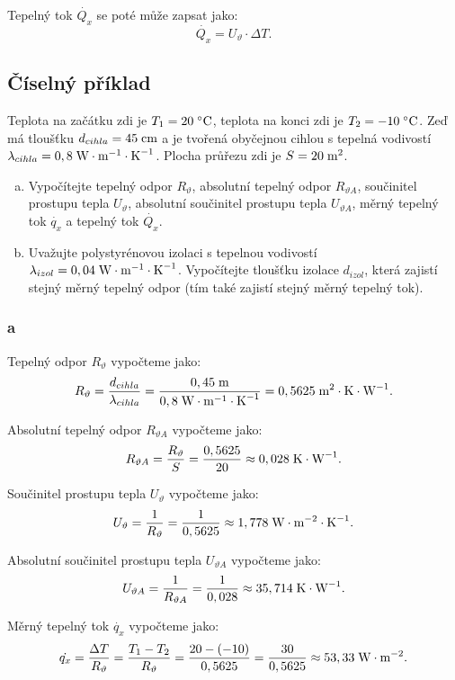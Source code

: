 \documentclass{article}
\begin{document}
Tepelný tok $\dot{Q_x}$ se poté může zapsat jako:
$$
    \dot{Q_x} = U_\vartheta \cdot \Delta T.
$$


\subsection{Číselný příklad}
Teplota na začátku zdi je $T_1 = 20 \; ^\circ \textrm{C}$, teplota na konci zdi je $T_2 = -10 \; ^\circ \textrm{C}$. Zeď má tloušťku $d_{cihla} = 45 \; \textrm{cm}$ a je tvořená obyčejnou cihlou s tepelná vodivostí $\lambda_{cihla} = 0,8 \; \textrm{W} \cdot \textrm{m}^{-1} \cdot \textrm{K}^{-1}$. Plocha průřezu zdi je $S = 20 \; \textrm{m}^{\textrm{2}}$.

\begin{enumerate}[a)]
    \item Vypočítejte tepelný odpor $R_{\vartheta}$,
          absolutní tepelný odpor $R_{\vartheta A}$, součinitel prostupu tepla $U_\vartheta$, absolutní součinitel prostupu tepla $U_{\vartheta A}$, měrný tepelný tok $\dot{q_x}$ a tepelný tok $\dot{Q_x}$.
    \item Uvažujte polystyrénovou izolaci s tepelnou vodivostí $\lambda_{izol} = 0,04 \; \textrm{W} \cdot \textrm{m}^{-1} \cdot \textrm{K}^{-1}$. Vypočítejte tloušťku izolace $d_{izol}$, která zajistí stejný měrný tepelný odpor (tím také zajistí stejný měrný tepelný tok).
\end{enumerate}

\subsubsection{a}
Tepelný odpor $R_{\vartheta}$ vypočteme jako:
$$
    R_{\vartheta} = \frac{d_{cihla}}{\lambda_{cihla}} = \frac{0,45 \; \textrm{m}}{0,8 \; \textrm{W} \cdot \textrm{m}^{-1} \cdot \textrm{K}^{-1}} = 0,5625 \; \textrm{m}^{\textrm{2}} \cdot \textrm{K} \cdot \textrm{W}^{-1}.
$$

Absolutní tepelný odpor $R_{\vartheta A}$ vypočteme jako:
$$
    R_{\vartheta A} = \frac{R_{\vartheta}}{S} = \frac{0,5625}{20} \approx 0,028 \; \textrm{K} \cdot \textrm{W}^{-1}.
$$

Součinitel prostupu tepla $U_\vartheta$ vypočteme jako:
$$
    U_\vartheta = \frac{1}{R_{\vartheta}} = \frac{1}{0,5625} \approx 1,778 \; \textrm{W} \cdot \textrm{m}^{-2} \cdot \textrm{K}^{-1}.
$$

Absolutní součinitel prostupu tepla $U_{\vartheta A}$ vypočteme jako:
$$
    U_{\vartheta A} = \frac{1}{R_{\vartheta A}} = \frac{1}{0,028} \approx 35,714 \; \textrm{K} \cdot \textrm{W}^{-1}.
$$

Měrný tepelný tok $\dot{q_x}$ vypočteme jako:
$$
    \dot{q_x} = \frac{\Delta T}{R_{\vartheta}} = \frac{T_1 - T_2}{R_{\vartheta}} = \frac{20 - (-10)}{0,5625} = \frac{30}{0,5625} \approx 53,33 \; \textrm{W} \cdot \textrm{m}^{-2}.
$$
\end{document}
